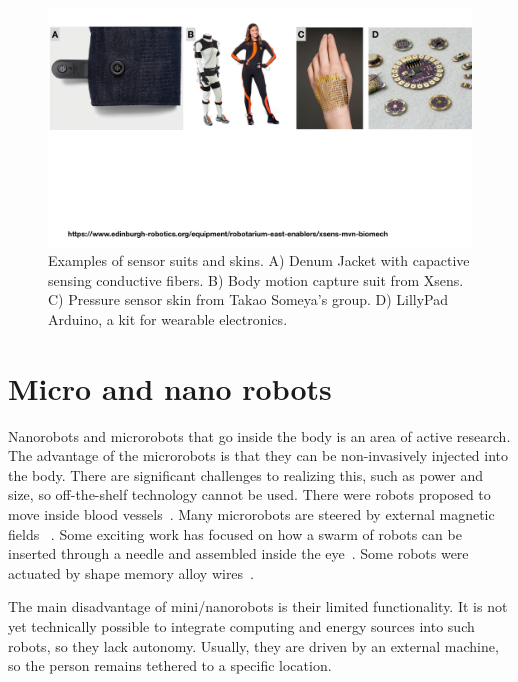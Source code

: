 \begin{figure}[!ht]
\centering
\includegraphics[width=\textwidth]{pictures/chapter2/textiles_sensors.pdf}
\caption{Examples of sensor suits and skins. A) Denum Jacket with capactive sensing conductive fibers. B) Body motion capture suit from Xsens. C) Pressure sensor skin from Takao Someya's group. D) LillyPad Arduino, a kit for wearable electronics. }
\label{fig:technologies_size_coverage}
\end{figure}


\section{Micro and nano robots}
Nanorobots and microrobots that go inside the body is an area of active research. The advantage of the microrobots is that they can be non-invasively injected into the body. There are significant challenges to realizing this, such as power and size, so off-the-shelf technology cannot be used. There were robots proposed to move inside blood vessels~\cite{cavalcanti2006nanorobot}. Many microrobots are steered by external magnetic fields ~\cite{nelson2010microrobots}. Some exciting work has focused on how a swarm of robots can be inserted through a needle and assembled inside the eye~\cite{wu2018swarm}. Some robots were actuated by shape memory alloy wires~\cite{webster2006toward}. 

 The main disadvantage of mini/nanorobots is their limited functionality. It is not yet technically possible to integrate computing and energy sources into such robots, so they lack autonomy. Usually, they are driven by an external machine, so the person remains tethered to a specific location.

